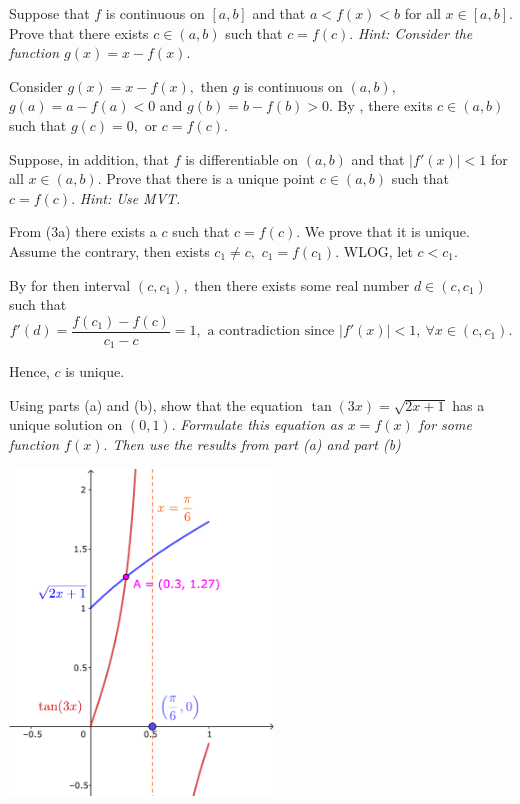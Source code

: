 \documentclass{article}
\begin{document}
\begin{problem*}[3a]
    Suppose that $f$ is continuous on $[a,b]$ and that $a < f(x) < b$ for all $x \in [a,b].$
    Prove that there exists $c \in (a, b)$ such that $c = f(c).$ 
    \textit{Hint: Consider the function $g(x) = x - f (x).$}
\end{problem*}

\begin{soln}
    Consider $g(x) = x - f(x),$ then $g$ is continuous on $(a,b),$ $g(a) = a - f(a) < 0$ and $g(b) = b - f(b) > 0.$
    By , there exits $c \in (a,b)$ such that $g(c) = 0,$ or $\boxed{c = f(c).}$
\end{soln}

\bigbreak

\begin{problem*}[3b]
    Suppose, in addition, that $f$ is differentiable on $(a,b)$ and that $|f'(x)| < 1$ for all $x \in (a,b).$
    Prove that there is a unique point $c \in (a, b)$ such that $c = f(c).$
    \textit{Hint: Use MVT.}
\end{problem*}

\begin{soln}
    From (3a) there exists a $c$ such that $c = f(c).$ We prove that it is unique.
    Assume the contrary, then exists $c_1 \ne c,$ $c_1 = f(c_1).$ WLOG, let $c < c_1.$

    By  for then interval $(c, c_1),$ then there exists some real number $d \in (c,c_1)$ such that 
    \[
        f'(d) = \frac{f(c_1) - f(c)}{c_1 - c} = 1, \text{\ a contradiction since\ } |f'(x)| < 1,\ \forall x \in (c, c_1).
    \]
    
    Hence, $c$ is unique.
\end{soln}

\newpage

\begin{problem*}[3c]
    Using parts (a) and (b), show that the equation $\tan(3x) = \sqrt{2x + 1}$ has a unique solution on $(0, 1).$
    \textit{Formulate this equation as $x = f(x)$ for some function $f(x).$ Then use the results from part (a) and part (b)}
\end{problem*}

\begin{center}
    \includegraphics[width=7cm]{./svg/pdf/derivative-2-3c.pdf}
\end{center}
\end{document}
